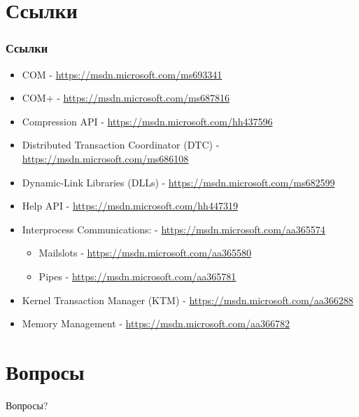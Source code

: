 \documentclass{beamer}
\begin{document}
\section{Ссылки}

\begin{frame}
\frametitle{Ссылки}

\begin{itemize}
\item COM - \url{https://msdn.microsoft.com/ms693341}
\item COM+ - \url{https://msdn.microsoft.com/ms687816}
\item Compression API - \url{https://msdn.microsoft.com/hh437596}
\item Distributed Transaction Coordinator (DTC) - \url{https://msdn.microsoft.com/ms686108}
\item Dynamic-Link Libraries (DLLs) - \url{https://msdn.microsoft.com/ms682599}
\item Help API - \url{https://msdn.microsoft.com/hh447319}
\item Interprocess Communications: - \url{https://msdn.microsoft.com/aa365574}
    \begin{itemize}
    \item Mailslots - \url{https://msdn.microsoft.com/aa365580}
    \item Pipes - \url{https://msdn.microsoft.com/aa365781}
    \end{itemize}
\item Kernel Transaction Manager (KTM) - \url{https://msdn.microsoft.com/aa366288}
\item Memory Management - \url{https://msdn.microsoft.com/aa366782}
\end{itemize}

\end{frame}

\section{Вопросы}

\begin{frame}
\Huge{\centerline{Вопросы?}}
\end{frame}

\end{document}

